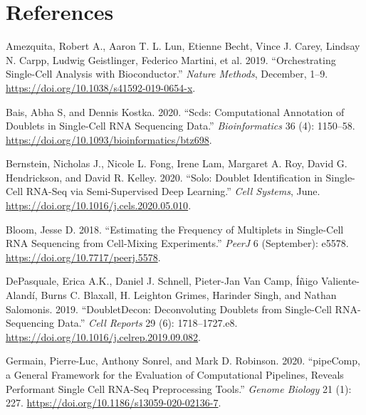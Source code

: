 \documentclass[10pt,a4paper,twocolumn]{article}
\begin{document}
\bigskip


\section*{References}

\begin{CSLReferences}{1}{0}
\leavevmode\hypertarget{ref-amezquitaOrchestratingSinglecellAnalysis2019}{}%
Amezquita, Robert A., Aaron T. L. Lun, Etienne Becht, Vince J. Carey, Lindsay N. Carpp, Ludwig Geistlinger, Federico Martini, et al. 2019. {``Orchestrating Single-Cell Analysis with Bioconductor.''} \emph{Nature Methods}, December, 1--9. \url{https://doi.org/10.1038/s41592-019-0654-x}.

\leavevmode\hypertarget{ref-baisScdsComputationalAnnotation2020}{}%
Bais, Abha S, and Dennis Kostka. 2020. {``Scds: Computational Annotation of Doublets in Single-Cell RNA Sequencing Data.''} \emph{Bioinformatics} 36 (4): 1150--58. \url{https://doi.org/10.1093/bioinformatics/btz698}.

\leavevmode\hypertarget{ref-bernsteinSoloDoublet2020}{}%
Bernstein, Nicholas J., Nicole L. Fong, Irene Lam, Margaret A. Roy, David G. Hendrickson, and David R. Kelley. 2020. {``Solo: Doublet Identification in Single-Cell RNA-Seq via Semi-Supervised Deep Learning.''} \emph{Cell Systems}, June. \url{https://doi.org/10.1016/j.cels.2020.05.010}.

\leavevmode\hypertarget{ref-bloomEstimatingFrequencyMultiplets2018}{}%
Bloom, Jesse D. 2018. {``Estimating the Frequency of Multiplets in Single-Cell RNA Sequencing from Cell-Mixing Experiments.''} \emph{PeerJ} 6 (September): e5578. \url{https://doi.org/10.7717/peerj.5578}.

\leavevmode\hypertarget{ref-depasqualeDoubletDeconDeconvoluting2019}{}%
DePasquale, Erica A.K., Daniel J. Schnell, Pieter-Jan Van Camp, Íñigo Valiente-Alandí, Burns C. Blaxall, H. Leighton Grimes, Harinder Singh, and Nathan Salomonis. 2019. {``DoubletDecon: Deconvoluting Doublets from Single-Cell RNA-Sequencing Data.''} \emph{Cell Reports} 29 (6): 1718--1727.e8. \url{https://doi.org/10.1016/j.celrep.2019.09.082}.

\leavevmode\hypertarget{ref-germainPipeCompGeneral2020b}{}%
Germain, Pierre-Luc, Anthony Sonrel, and Mark D. Robinson. 2020. {``pipeComp, a General Framework for the Evaluation of Computational Pipelines, Reveals Performant Single Cell RNA-Seq Preprocessing Tools.''} \emph{Genome Biology} 21 (1): 227. \url{https://doi.org/10.1186/s13059-020-02136-7}.


\end{CSLReferences}
\end{document}
